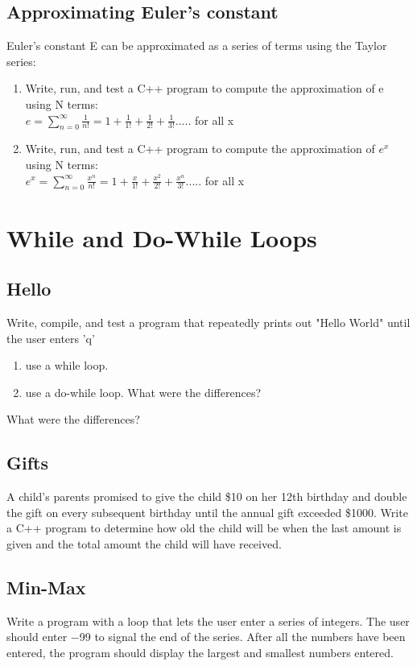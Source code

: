 \documentclass{article}
\begin{document}
\subsection{Approximating Euler's constant}
Euler's constant E can be approximated as a series of terms using the Taylor series:\\

\begin{enumerate}

\item Write, run, and test a C++ program to compute the approximation of e using N terms:\\
$e = \displaystyle \sum^{\infty  }_{n=0}\frac{1}{n!} = 1 + \frac{1}{1!} + \frac{1}{2!} + \frac{1}{3!} .....$ for all x
\item Write, run, and test a C++ program to compute the approximation of $e^{x}$ using N terms:\\
$e^{x}=\displaystyle \sum^{\infty}_{n=0}\frac{x^{n}}{n!} = 1 + \frac{x}{1!} + \frac{x^{2}}{2!} + \frac{x^{n}}{3!}.....$ for all x
\end{enumerate}

\section{While and Do-While Loops}

\subsection{Hello}
Write, compile, and test a program that repeatedly prints out "Hello World" until the user enters 'q'
\begin{enumerate}
	\item use a while loop.
	\item use a do-while loop. What were the differences?
\end{enumerate}
 What were the differences?

\subsection{Gifts}
A child’s parents promised to give the child \$10 on her 12th birthday and double the gift on every subsequent birthday until the annual gift exceeded \$1000. Write a C++ program to determine how old the child will be when the last amount is given and the total amount the child will have received.

\subsection{Min-Max}
Write a program with a loop that lets the user enter a series of integers. The user should
enter −99 to signal the end of the series. After all the numbers have been entered, the
program should display the largest and smallest numbers entered.
\end{document}
